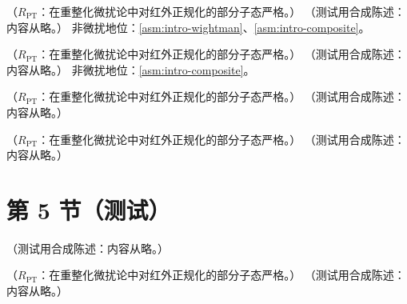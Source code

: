\begin{theorem}[PDF 的矩 = 扭度 2 定域算符矩阵元 \tagR]\label{thm:pdf-moments-local}
（$R_{\mathrm{PT}}$：在重整化微扰论中对红外正规化的部分子态严格。）
（测试用合成陈述：内容从略。）
非微扰地位：\cref{asm:intro-wightman}、\cref{asm:intro-composite}。
\end{theorem}

\begin{theorem}\label{thm:pdf-dglap}
（$R_{\mathrm{PT}}$：在重整化微扰论中对红外正规化的部分子态严格。）
（测试用合成陈述：内容从略。）
非微扰地位：\cref{asm:intro-composite}。
\end{theorem}

\begin{proposition}\label{prop:pdf-lo-kernels}
（$R_{\mathrm{PT}}$：在重整化微扰论中对红外正规化的部分子态严格。）
（测试用合成陈述：内容从略。）
\end{proposition}

\begin{proposition}\label{prop:pdf-pqq-operator}
（$R_{\mathrm{PT}}$：在重整化微扰论中对红外正规化的部分子态严格。）
（测试用合成陈述：内容从略。）
\end{proposition}

\section{第 5 节（测试）}\label{sec:pdf-dglap}

\begin{example}\label{ex:pdf-oneloop}
（测试用合成陈述：内容从略。）
\end{example}

\begin{proposition}\label{prop:pdf-partonic-dr}
（$R_{\mathrm{PT}}$：在重整化微扰论中对红外正规化的部分子态严格。）
（测试用合成陈述：内容从略。）
\end{proposition}

